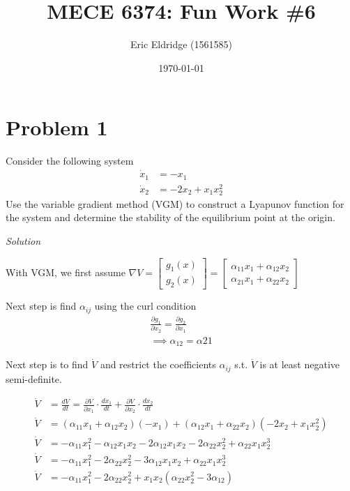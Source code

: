 \documentclass{article}
\title{MECE 6374: Fun Work \#6}
\date{\today}
\author{Eric Eldridge (1561585)}
\begin{document}

  \maketitle

  \section{Problem 1}

  Consider the following system
  \begin{align*}
    \dot{x}_1 &= -x_1 \\
    \dot{x}_2 &= -2x_2 +x_1x_2^2
  \end{align*}
  Use the variable gradient method (VGM) to construct a Lyapunov function for the
  system and determine the stability of the equilibrium point at the origin.
  \newline \newline

  \noindent \textit{Solution} \newline \newline

  With VGM, we first assume $\nabla V =
  \begin{bmatrix}
    g_1(x) \\
    g_2(x)
  \end{bmatrix} =
  \begin{bmatrix}
    \alpha_{11}x_1 + \alpha_{12}x_2 \\
    \alpha_{21}x_1 + \alpha_{22}x_2
  \end{bmatrix}$ \newline
  
  Next step is find $\alpha_{ij}$ using the curl condition \newline
  \begin{align*}
    \frac{\partial g_1}{\partial x_2} = \frac{\partial g_2}{\partial x_1} \\
    \implies \alpha_{12} = \alpha{21}
  \end{align*}

  Next step is to find $\dot{V}$ and restrict the coefficients $\alpha_{ij}$
  s.t. $\dot{V}$ is at least negative semi-definite.

  \begin{align*}
    \dot{V} &= \frac{dV}{dt} = \frac{\partial V}{\partial x_1} \cdot \frac{dx_1}{dt} + \frac{\partial V}{\partial x_2} \cdot \frac{dx_2}{dt} \\
    \dot{V} &= (\alpha_{11}x_1 + \alpha_{12}x_2)(-x_1) + (\alpha_{12}x_1 + \alpha_{22}x_2)(-2x_2 + x_1x_2^2) \\
    \dot{V} &= -\alpha_{11}x_1^2 - \alpha_{12}x_1x_2 - 2\alpha_{12}x_1x_2 -2\alpha_{22}x_2^2 + \alpha_{22}x_1x_2^3 \\
    \dot{V} &= -\alpha_{11}x_1^2 - 2\alpha_{22}x_2^2 - 3\alpha_{12}x_1x_2 + \alpha_{22}x_1x_2^3 \\
    \dot{V} &= -\alpha_{11}x_1^2 - 2\alpha_{22}x_2^2 + x_1x_2(\alpha_{22}x_2^2 -3\alpha_{12})
  \end{align*}
\end{document}
